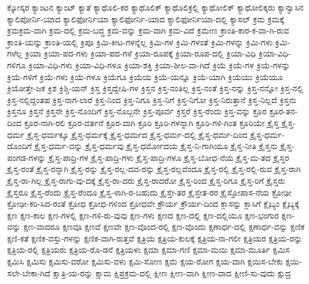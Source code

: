 {ಕ್ಕೋಸ್ಕರ
ಕ್ಯಾಂಟನ
ಕ್ಯಾಂಟ್
ಕ್ಯಾತೆ
ಕ್ಯಾಥೊಲಿ-ಕರ
ಕ್ಯಾಥೊಲಿಕ್
ಕ್ಯಾಥೊಲಿಕ್ರಲ್ಲಿ
ಕ್ಯಾಥೋಲಿಕ್
ಕ್ಯಾಥೋಲಿಕ್ಕರು
ಕ್ಯಾನ್ವಾಸಿನ
ಕ್ಯಾಲಿಪೋರ್ನಿ-ಯಾದ
ಕ್ಯಾಲಿಫೋರ್ನಿಯಾ
ಕ್ಯಾಲಿಫೋರ್ನಿ-ಯಾದ
ಕ್ಯಾಲಿಫೋರ್ನಿಯಾ-ದಲ್ಲಿ
ಕ್ಯಾಸಲ್
ಕ್ರಮ
ಕ್ರಮಕ್ಕೆ
ಕ್ರಮಕ್ರಮ-ವಾಗಿ
ಕ್ರಮ-ದಲ್ಲಿ
ಕ್ರಮ-ಬದ್ಧ
ಕ್ರಮ-ವನ್ನು
ಕ್ರಮ-ವಾಗಿ
ಕ್ರಮ-ವಿದೆ
ಕ್ರಮೇಣ
ಕ್ರಾಂತಿ-ಕಾರ-ಕ-ವಾ-ಗಿ-ರುವ
ಕ್ರಾಂತಿ-ಯನ್ನು
ಕ್ರಾಂತಿ-ಯಲ್ಲಿ
ಕ್ರಿಪೂ
ಕ್ರಿಮಿ-ಕೀಟ-ಗಳನ್ನೆಲ್ಲ
ಕ್ರಿಮಿ-ಗಳ
ಕ್ರಿಮಿ-ಗಳಂತೆ
ಕ್ರಿಮಿ-ಗಳನ್ನು
ಕ್ರಿಮಿ-ಗಳು
ಕ್ರಿಮಿ-ಗಳೆಲ್ಲ
ಕ್ರಿಯಾ
ಕ್ರಿಯಾ-ಪದ-ಗಳು
ಕ್ರಿಯಾ-ಪದ-ಗಳೆ
ಕ್ರಿಯಾ-ರೂಪಕ್ಕೆ
ಕ್ರಿಯಾ-ರೂಪ-ದಲ್ಲಿ
ಕ್ರಿಯಾ-ವಿಧಿ
ಕ್ರಿಯಾ-ವಿಧಿ-ಗಳಿಗೂ
ಕ್ರಿಯಾ-ವಿಧಿ-ಗಳು
ಕ್ರಿಯಾ-ವಿಧಿ-ಗಳೂ
ಕ್ರಿಯಾ-ಶಕ್ತಿ
ಕ್ರಿಯಾ-ಶೀಲ-ವಾ-ಗಿದೆ
ಕ್ರಿಯೆ
ಕ್ರಿಯೆ-ಗಳ
ಕ್ರಿಯೆ-ಗಳನ್ನು
ಕ್ರಿಯೆ-ಗಳಿಗೆ
ಕ್ರಿಯೆ-ಗಳು
ಕ್ರಿಯೆ-ಗಳೂ
ಕ್ರಿಯೆಗೂ
ಕ್ರಿಯೆಯ
ಕ್ರಿಯೆ-ಯನ್ನೂ
ಕ್ರಿಯೆ-ಯಾಗಿ
ಕ್ರಿಯೆಯು
ಕ್ರಿಯೆಯೂ
ಕ್ರಿಯೋತ್ತೇ-ಜಕ
ಕ್ರಿಶ
ಕ್ರಿಶ್ಚಿ-ಯನ್
ಕ್ರಿಸ್ತ
ಕ್ರಿಸ್ತದ್ವೇಷಿ-ಗಳ
ಕ್ರಿಸ್ತನ
ಕ್ರಿಸ್ತ-ನಂತಿಲ್ಲ
ಕ್ರಿಸ್ತ-ನಂತೆ
ಕ್ರಿಸ್ತ-ನನ್ನು
ಕ್ರಿಸ್ತ-ನನ್ನೋ
ಕ್ರಿಸ್ತ-ನಲ್ಲಿ
ಕ್ರಿಸ್ತ-ನಲ್ಲಿದ್ದಂತಹ
ಕ್ರಿಸ್ತ-ನಾಗ-ಲಾರೆ
ಕ್ರಿಸ್ತ-ನಿಂದ
ಕ್ರಿಸ್ತ-ನಿಗೂ
ಕ್ರಿಸ್ತ-ನಿಗೆ
ಕ್ರಿಸ್ತ-ನಿಗೋ
ಕ್ರಿಸ್ತ-ನಿರುತ್ತಾನೆ
ಕ್ರಿಸ್ತ-ನಿಲ್ಲದೆ
ಕ್ರಿಸ್ತನು
ಕ್ರಿಸ್ತನೂ
ಕ್ರಿಸ್ತನೆ
ಕ್ರಿಸ್ತನೇ
ಕ್ರಿಸ್ತ-ನೊಂದಿಗೆ
ಕ್ರಿಸ್ತ-ನೊಬ್ಬನೇ
ಕ್ರಿಸ್ತ-ಪೂರ್ವ
ಕ್ರಿಸ್ತರೆ
ಕ್ರಿಸ್ತ-ರೆಂದು
ಕ್ರಿಸ್ತ-ವನ್ನು
ಕ್ರೂರ
ಕ್ರೂರ-ತನ-ದಿಂದ
ಕ್ರೂರ-ನಾಗಿ-ರಲಿ
ಕ್ರೂರ-ವರ್ತನೆ
ಕ್ರೂರ-ವಾಗಿ
ಕ್ರೂರಿ
ಕ್ರೂರಿ-ಗಳನ್ನಾಗಿ
ಕ್ರೂರಿ-ಗಳಿ-ಗಿಂತ
ಕ್ರೂರಿಯೇ
ಕ್ರೈಸ್ತ
ಕ್ರೈಸ್ತ-ಧರ್ಮ
ಕ್ರೈಸ್ತ-ಧರ್ಮಕ್ಕೂ
ಕ್ರೈಸ್ತ-ಧರ್ಮಕ್ಕೆ
ಕ್ರೈಸ್ತ-ಧರ್ಮದ
ಕ್ರೈಸ್ತ-ಧರ್ಮ-ದಲ್ಲಿ
ಕ್ರೈಸ್ತ-ಧರ್ಮ-ದಿಂದ
ಕ್ರೈಸ್ತ-ಧರ್ಮ-ದೊಂದಿಗೆ
ಕ್ರೈಸ್ತ-ಧರ್ಮ-ವನ್ನು
ಕ್ರೈಸ್ತ-ಧರ್ಮವು
ಕ್ರೈಸ್ತ-ಧರ್ಮೋದಯ
ಕ್ರೈಸ್ತ-ನಿ-ಗಾಗಿಯೂ
ಕ್ರೈಸ್ತ-ನೀತಿ
ಕ್ರೈಸ್ತನು
ಕ್ರೈಸ್ತ-ಪಂಗಡ-ಗಳನ್ನು
ಕ್ರೈಸ್ತ-ಪಾದ್ರಿ-ಗಳ
ಕ್ರೈಸ್ತ-ಪಾದ್ರಿ-ಗಳು
ಕ್ರೈಸ್ತ-ಪಾದ್ರಿ-ಗಳೂ
ಕ್ರೈಸ್ತ-ಬೋಧ-ನೆಯ
ಕ್ರೈಸ್ತ-ಮ-ತದ
ಕ್ರೈಸ್ತರ
ಕ್ರೈಸ್ತ-ರಂತೆ
ಕ್ರೈಸ್ತ-ರನ್ನಾಗಿ
ಕ್ರೈಸ್ತ-ರನ್ನು
ಕ್ರೈಸ್ತ-ರಲ್ಲ-ದವ-ರನ್ನು
ಕ್ರೈಸ್ತ-ರಲ್ಲವೆಂದೂ
ಕ್ರೈಸ್ತ-ರಲ್ಲಿ
ಕ್ರೈಸ್ತ-ರಲ್ಲಿ-ರುವ
ಕ್ರೈಸ್ತ-ರಾಗಿ
ಕ್ರೈಸ್ತ-ರಾ-ಗಿಲ್ಲ
ಕ್ರೈಸ್ತ-ರಾಗು-ವು-ದಕ್ಕೆ
ಕ್ರೈಸ್ತ-ರಾ-ದರು
ಕ್ರೈಸ್ತ-ರಾದರೋ
ಕ್ರೈಸ್ತ-ರಿಂದ
ಕ್ರೈಸ್ತ-ರಿಗೂ
ಕ್ರೈಸ್ತ-ರಿಗೆ
ಕ್ರೈಸ್ತರು
ಕ್ರೈಸ್ತರೂ
ಕ್ರೈಸ್ತ-ರೆಂದು
ಕ್ರೈಸ್ತ-ರೆಂದೂ
ಕ್ರೈಸ್ತ-ಳಾಗಿ-ರ-ಬಹುದು
ಕ್ರೈಸ್ತೇ-ತರ
ಕ್ರೈಸ್ತೇತ-ರರ
ಕ್ರೈಸ್ತೋಪಾಸ-ನೆಯ
ಕ್ರೋಢೀ
ಕ್ರೋಢೀ-ಕರಿ-ಸಿದ-ರಂತೆ
ಕ್ರೋಧ
ಕ್ರೋಧ-ಗಳಿಂದ
ಕ್ರೋಧವೇ
ಕ್ರೌರ್ಯ
ಕ್ರೌರ್ಯ-ದಿಂದ
ಕ್ಲಾಸನ್ನು
ಕ್ಲಾಸಿಗೆ
ಕ್ಲೈಬ್ಯಂ
ಕ್ಲೈಬ್ಯಕ್ಕೆ
ಕ್ಷಣ
ಕ್ಷಣ-ಕಾಲ
ಕ್ಷಣ-ಗಳಲ್ಲಿ
ಕ್ಷಣ-ಗಳಿ-ರು-ವುವು
ಕ್ಷಣ-ಗಳು
ಕ್ಷಣದ
ಕ್ಷಣ-ದಲ್ಲಿ
ಕ್ಷಣ-ದಲ್ಲಿಯೂ
ಕ್ಷಣ-ಭಂಗುರ
ಕ್ಷಣ-ವನ್ನು
ಕ್ಷಣ-ವಾದರೂ
ಕ್ಷಣವೂ
ಕ್ಷಣವೆ
ಕ್ಷಣವೇ
ಕ್ಷಣ-ವೊಂದ-ರಲ್ಲಿ
ಕ್ಷಣ-ವೊಂದು
ಕ್ಷಣಾರ್ಧ-ದಲ್ಲಿ
ಕ್ಷಣಾರ್ಧ-ವನ್ನು
ಕ್ಷಣಿಕ
ಕ್ಷಣಿ-ಕತೆ
ಕ್ಷಣಿಕ-ವಸ್ತು-ಗಳನ್ನು
ಕ್ಷಣಿಕ-ವಾಗಿ-ರುತ್ತವೆ
ಕ್ಷತ್ರಿಯ
ಕ್ಷತ್ರಿಯ-ಕುಲಕ್ಕೆ
ಕ್ಷತ್ರಿಯ-ನಾ-ಗಲೀ
ಕ್ಷತ್ರಿಯರ
ಕ್ಷತ್ರಿಯ-ರನ್ನು
ಕ್ಷತ್ರಿಯ-ರಲ್ಲಿ
ಕ್ಷತ್ರಿಯರು
ಕ್ಷತ್ರಿಯ-ರೊ-ಡನೆ
ಕ್ಷತ್ರಿಯಳು
ಕ್ಷಮಾ
ಕ್ಷಮಾ-ಗಣಿ
ಕ್ಷಮಾ-ಮಯಿ
ಕ್ಷಮಾ-ಮೂರ್ತಿ
ಕ್ಷಮಿಸ
ಕ್ಷಮಿಸಿ
ಕ್ಷಮಿಸು
ಕ್ಷಮಿಸು-ವರೋ
ಕ್ಷಮಿಸು-ವಳು
ಕ್ಷಮಿ-ಸೋಣ
ಕ್ಷಮೆ
ಕ್ಷಯ-ರೋಗ
ಕ್ಷಯ-ವಾಗಿ
ಕ್ಷಯಿಸ-ಬೇಕು
ಕ್ಷಯಿ-ಸಲೇ-ಬೇಕಾ-ಗಿದೆ
ಕ್ಷಾತ್ರಿ-ಯ-ರನ್ನು
ಕ್ಷಾಮ
ಕ್ಷಿಪ್ರಕ್ರಮ-ದಲ್ಲಿ
ಕ್ಷೀಣ
ಕ್ಷೀಣ-ವಾಗಿ
ಕ್ಷೀಣ-ವಾದ
ಕ್ಷೀಣಿ-ಸು-ವುದು
ಕ್ಷುದ್ರ
}
